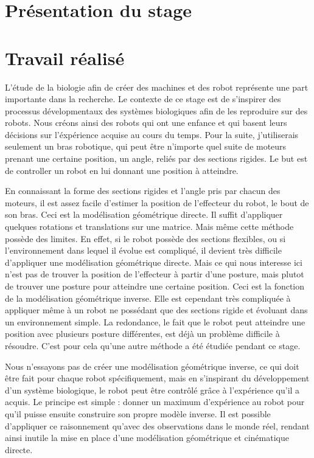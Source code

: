 \documentclass[11pt,french]{report}
\begin{document}
\chapter{Présentation du stage}

\chapter{Travail réalisé}

L'étude de la biologie afin de créer des machines et des robot représente une part importante dans la recherche. Le contexte de ce stage est de s'inspirer des processus dévelopmentaux des systèmes biologiques afin de les reproduire sur des robots. Nous créons ainsi des robots qui ont une enfance et qui basent leurs décisions sur l'éxpérience acquise au cours du temps. Pour la suite, j'utiliserais seulement un bras robotique, qui peut être n'importe quel suite de moteurs prenant une certaine position, un angle, reliés par des sections rigides. Le but est de controller un robot en lui donnant une position à atteindre.

En connaissant la forme des sections rigides et l'angle pris par chacun des moteurs, il est assez facile d'estimer la position de l'effecteur du robot, le bout de son bras. Ceci est la modélisation géométrique directe. Il suffit d'appliquer quelques rotations et translations sur une matrice. Mais même cette méthode possède des limites. En effet, si le robot possède des sections flexibles, ou si l'environnement dans lequel il évolue est compliqué, il devient très difficile d'appliquer une modélisation géométrique directe. Mais ce qui nous interesse ici n'est pas de trouver la position de l'effecteur à partir d'une posture, mais plutot de trouver une posture pour atteindre une certaine position. Ceci est la fonction de la modélisation géométrique inverse. Elle est cependant très compliquée à appliquer même à un robot ne possédant que des sections rigide et évoluant dans un environnement simple. La redondance, le fait que le robot peut atteindre une position avec plusieurs posture différentes, est déjà un problème difficile à résoudre. C'est pour cela qu'une autre méthode a été étudiée pendant ce stage.

Nous n'essayons pas de créer une modélisation géométrique inverse, ce qui doit être fait pour chaque robot spécifiquement, mais en s'inspirant du développement d'un système biologique, le robot peut être contrôlé grâce à l'expérience qu'il a acquis. Le principe est simple : donner un maximum d'expérience au robot pour qu'il puisse ensuite construire son propre modèle inverse. Il est possible d'appliquer ce raisonnement qu'avec des observations dans le monde réel, rendant ainsi inutile la mise en place d'une modélisation géométrique et cinématique directe.
\end{document}
